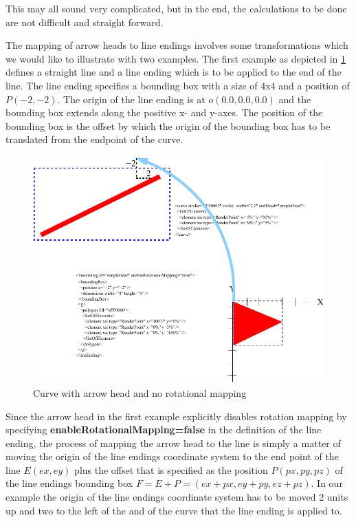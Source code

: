 This may all sound very complicated, but in the end, the calculations to be done are not difficult and straight forward. 

The mapping of arrow heads to line endings involves some transformations which we would like to illustrate with two examples.
The first example as depicted in \ref{fig:2ArrowHeadMapping} defines a straight line and a line ending which is to be applied
to the end of the line. The line ending specifies a bounding box with a size of 4x4 and a position of $P(-2,-2)$. 
The origin of the line ending is at $o(0.0,0.0,0.0)$ and the bounding box extends along the positive x- and y-axes.
The position of the bounding box is the offset by which the origin of the bounding box has to be translated from the endpoint of the curve.

\begin{figure}[!h]
\begin{center}
\includegraphics{figures/ArrowHeadMapping2.pdf}
\end{center}
\caption{Curve with arrow head and no rotational mapping} \label{fig:2ArrowHeadMapping}
\end{figure}

Since the arrow head in the first example explicitly disables rotation mapping by specifying \textbf{enableRotationalMapping=false}
in the definition of the line ending, the process of mapping the arrow head to the line is simply a matter of moving the origin of 
the line endings coordinate system to the end point of the line $E(ex,ey)$ plus the offset that is specified as the position $P(px,py,pz)$ of the line endings bounding box $F=E+P=(ex+px,ey+py,ez+pz)$. In our example the origin of the line endings coordinate system has to be moved 2 units up and two to the left of the and of the curve that the line ending is applied to.

